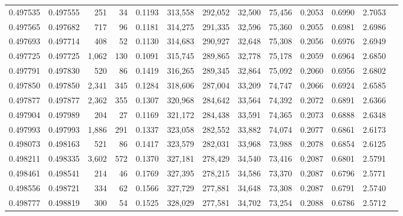 \begin{tabular}{rrrrrrrrrrrrr}
0.497535 & 0.497555 &   251 &    34 &                                     0.1193 & 313,558 & 292,052 &  32,500 &  75,456 & 0.2053 & 0.6990 & 2.7053 \\
0.497565 & 0.497682 &   717 &    96 &                                     0.1181 & 314,275 & 291,335 &  32,596 &  75,360 & 0.2055 & 0.6981 & 2.6986 \\
0.497693 & 0.497714 &   408 &    52 &                                     0.1130 & 314,683 & 290,927 &  32,648 &  75,308 & 0.2056 & 0.6976 & 2.6949 \\
0.497725 & 0.497725 & 1,062 &   130 &                                     0.1091 & 315,745 & 289,865 &  32,778 &  75,178 & 0.2059 & 0.6964 & 2.6850 \\
0.497791 & 0.497830 &   520 &    86 &                                     0.1419 & 316,265 & 289,345 &  32,864 &  75,092 & 0.2060 & 0.6956 & 2.6802 \\
0.497850 & 0.497850 & 2,341 &   345 &                                     0.1284 & 318,606 & 287,004 &  33,209 &  74,747 & 0.2066 & 0.6924 & 2.6585 \\
0.497877 & 0.497877 & 2,362 &   355 &                                     0.1307 & 320,968 & 284,642 &  33,564 &  74,392 & 0.2072 & 0.6891 & 2.6366 \\
0.497904 & 0.497989 &   204 &    27 &                                     0.1169 & 321,172 & 284,438 &  33,591 &  74,365 & 0.2073 & 0.6888 & 2.6348 \\
0.497993 & 0.497993 & 1,886 &   291 &                                     0.1337 & 323,058 & 282,552 &  33,882 &  74,074 & 0.2077 & 0.6861 & 2.6173 \\
0.498073 & 0.498163 &   521 &    86 &                                     0.1417 & 323,579 & 282,031 &  33,968 &  73,988 & 0.2078 & 0.6854 & 2.6125 \\
0.498211 & 0.498335 & 3,602 &   572 &                                     0.1370 & 327,181 & 278,429 &  34,540 &  73,416 & 0.2087 & 0.6801 & 2.5791 \\
0.498461 & 0.498541 &   214 &    46 &                                     0.1769 & 327,395 & 278,215 &  34,586 &  73,370 & 0.2087 & 0.6796 & 2.5771 \\
0.498556 & 0.498721 &   334 &    62 &                                     0.1566 & 327,729 & 277,881 &  34,648 &  73,308 & 0.2087 & 0.6791 & 2.5740 \\
0.498777 & 0.498819 &   300 &    54 &                                     0.1525 & 328,029 & 277,581 &  34,702 &  73,254 & 0.2088 & 0.6786 & 2.5712 \\

\end{tabular}
